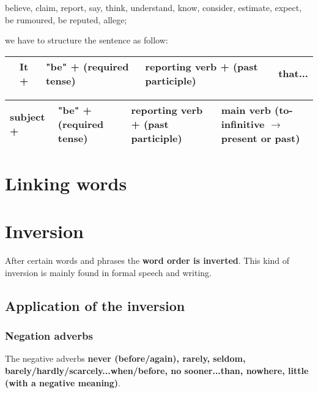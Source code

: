 \documentclass{article}
\begin{document}
believe, claim, report, say, think, understand, know, consider,
estimate, expect, be rumoured, be reputed, allege;

we have to structure the sentence as follow:\\

\begin{flushleft}
    \begin{tabular}{|m{0cm}>{\centering\arraybackslash}m{1cm}|>{\centering\arraybackslash}m{4.5cm}|>{\centering\arraybackslash}m{6cm}|>{\centering\arraybackslash}m{2cm}|}
        \hline \rule{0pt}{15pt}
        & It + & \textbf{"be"} + (required tense) & \textbf{reporting verb} + (past participle) & that... \\ 
        \hline
    \end{tabular}
\end{flushleft} \phantom{}

\begin{flushleft}
    \begin{tabular}{|>{\centering\arraybackslash}m{1.5cm}|>{\centering\arraybackslash}m{4cm}|>{\centering\arraybackslash}m{5.5cm}|>{\centering\arraybackslash}m{4cm}|}
        \hline
        subject + & \textbf{"be"} + (required tense) & \textbf{reporting verb} + (past participle) & main verb (to-infinitive $\rightarrow$ present or past) \\ 
        \hline
    \end{tabular}
\end{flushleft}

\section{Linking words}

\section{Inversion}
After certain words and phrases the \textbf{word order is inverted}.
This kind of inversion is mainly found in formal speech and writing.

\subsection{Application of the inversion}
\subsubsection{Negation adverbs}
The negative adverbs \textbf{never (before/again), rarely, seldom,
barely/hardly/scarcely...when/before, no sooner...than, nowhere,
little (with a negative meaning)}.
\end{document}
